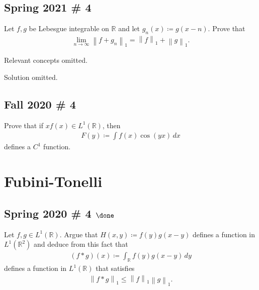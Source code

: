 \hypertarget{spring-2021-4}{%
\subsection{Spring 2021 \# 4}\label{spring-2021-4}}

Let \(f, g\) be Lebesgue integrable on \({\mathbb{R}}\) and let
\(g_n(x) \coloneqq g(x- n)\). Prove that
\begin{align*}
\lim_{n\to \infty } {\left\lVert {f + g_n} \right\rVert}_1 = {\left\lVert {f} \right\rVert}_1 + {\left\lVert {g} \right\rVert}_1
.\end{align*}

Relevant concepts omitted.

Solution omitted.

\hypertarget{fall-2020-4}{%
\subsection{Fall 2020 \# 4}\label{fall-2020-4}}

Prove that if \(xf(x) \in L^1({\mathbb{R}})\), then
\begin{align*}  
F(y) \coloneqq\int f(x) \cos(yx)\,  dx
\end{align*}
defines a \(C^1\) function.

\hypertarget{fubini-tonelli}{%
\section{Fubini-Tonelli}\label{fubini-tonelli}}

\hypertarget{spring-2020-4-done}{%
\subsection{\texorpdfstring{Spring 2020 \# 4
\(\done\)}{Spring 2020 \# 4 \textbackslash done}}\label{spring-2020-4-done}}

Let \(f, g\in L^1({\mathbb{R}})\). Argue that
\(H(x, y) \coloneqq f(y) g(x-y)\) defines a function in
\(L^1({\mathbb{R}}^2)\) and deduce from this fact that
\begin{align*}
(f\ast g)(x) \coloneqq\int_{\mathbb{R}}f(y) g(x-y) \,dy
\end{align*}
defines a function in \(L^1({\mathbb{R}})\) that satisfies
\begin{align*}
{\left\lVert {f\ast g} \right\rVert}_1 \leq {\left\lVert {f} \right\rVert}_1 {\left\lVert {g} \right\rVert}_1
.\end{align*}

